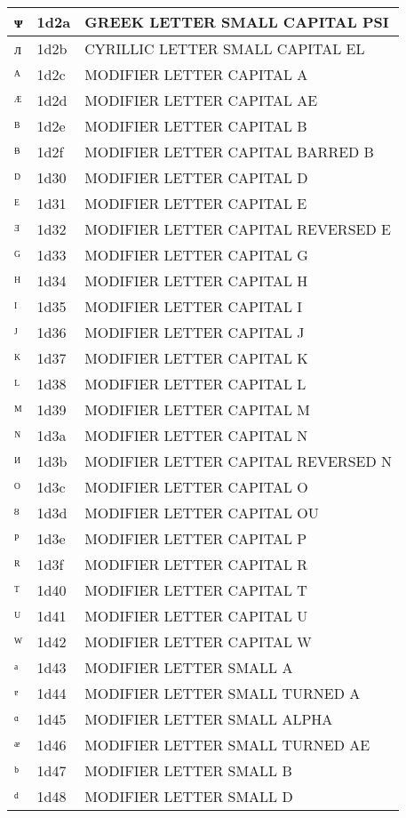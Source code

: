 \documentclass[12pt,letterpaper,openany]{book}
\begin{document}
\begin{center}
\begin{supertabular}{|m{0.25in}|m{0.5in}|m{4in}|}
ᴪ & 1d2a & GREEK LETTER SMALL CAPITAL PSI\\\hline
ᴫ & 1d2b & CYRILLIC LETTER SMALL CAPITAL EL\\\hline
ᴬ & 1d2c & MODIFIER LETTER CAPITAL A\\\hline
ᴭ & 1d2d & MODIFIER LETTER CAPITAL AE\\\hline
ᴮ & 1d2e & MODIFIER LETTER CAPITAL B\\\hline
ᴯ & 1d2f & MODIFIER LETTER CAPITAL BARRED B\\\hline
ᴰ & 1d30 & MODIFIER LETTER CAPITAL D\\\hline
ᴱ & 1d31 & MODIFIER LETTER CAPITAL E\\\hline
ᴲ & 1d32 & MODIFIER LETTER CAPITAL REVERSED E\\\hline
ᴳ & 1d33 & MODIFIER LETTER CAPITAL G\\\hline
ᴴ & 1d34 & MODIFIER LETTER CAPITAL H\\\hline
ᴵ & 1d35 & MODIFIER LETTER CAPITAL I\\\hline
ᴶ & 1d36 & MODIFIER LETTER CAPITAL J\\\hline
ᴷ & 1d37 & MODIFIER LETTER CAPITAL K\\\hline
ᴸ & 1d38 & MODIFIER LETTER CAPITAL L\\\hline
ᴹ & 1d39 & MODIFIER LETTER CAPITAL M\\\hline
ᴺ & 1d3a & MODIFIER LETTER CAPITAL N\\\hline
ᴻ & 1d3b & MODIFIER LETTER CAPITAL REVERSED N\\\hline
ᴼ & 1d3c & MODIFIER LETTER CAPITAL O\\\hline
ᴽ & 1d3d & MODIFIER LETTER CAPITAL OU\\\hline
ᴾ & 1d3e & MODIFIER LETTER CAPITAL P\\\hline
ᴿ & 1d3f & MODIFIER LETTER CAPITAL R\\\hline
ᵀ & 1d40 & MODIFIER LETTER CAPITAL T\\\hline
ᵁ & 1d41 & MODIFIER LETTER CAPITAL U\\\hline
ᵂ & 1d42 & MODIFIER LETTER CAPITAL W\\\hline
ᵃ & 1d43 & MODIFIER LETTER SMALL A\\\hline
ᵄ & 1d44 & MODIFIER LETTER SMALL TURNED A\\\hline
ᵅ & 1d45 & MODIFIER LETTER SMALL ALPHA\\\hline
ᵆ & 1d46 & MODIFIER LETTER SMALL TURNED AE\\\hline
ᵇ & 1d47 & MODIFIER LETTER SMALL B\\\hline
ᵈ & 1d48 & MODIFIER LETTER SMALL D\\\hline

\end{supertabular}
\end{center}
\end{document}
